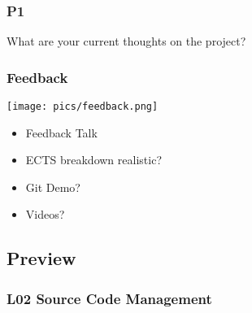 \begin{assignment}
	\frametitle{P1}

	\begin{task}
	What are your current thoughts on the project?
	\end{task}
\end{assignment}

\begin{frame}
	\frametitle{Feedback}

	\hfill \texttt{[image: pics/feedback.png]}
	\vspace{-1cm}
	\begin{itemize}
		\item Feedback Talk
		\item ECTS breakdown realistic?
		\item Git Demo?
		\item Videos?
	\end{itemize}
\end{frame}

\subsection{Preview}

\begin{frame}
	\frametitle{L02 Source Code Management}
\end{frame}



\nocite{raab2017introducing}

\appendix

\begin{frame}[allowframebreaks]
	
	
\end{frame}




